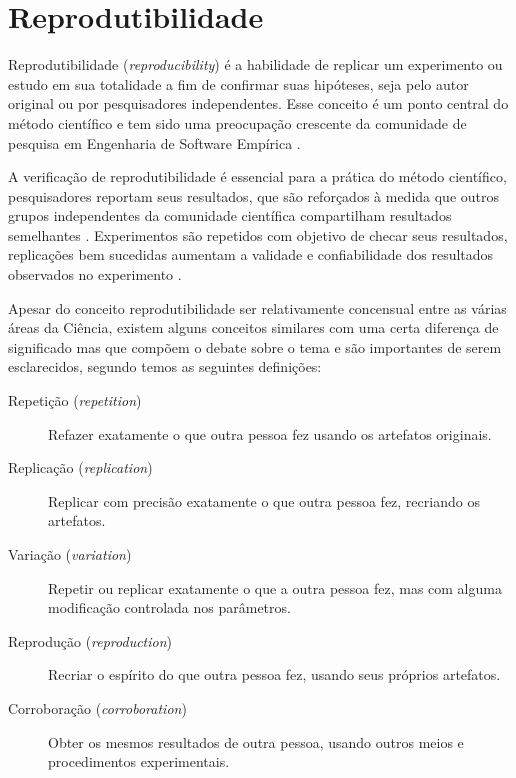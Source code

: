 \section{Reprodutibilidade}

Reprodutibilidade ({\it reproducibility}) é a habilidade de replicar um
experimento ou estudo em sua totalidade a fim de confirmar suas hipóteses, seja
pelo autor original ou por pesquisadores independentes. Esse conceito é um
ponto central do método científico e tem sido uma preocupação crescente da
comunidade de pesquisa em Engenharia de Software Empírica
\cite{gonzalez_reproducibility_2012}.

A verificação de reprodutibilidade é essencial para a prática do método
científico, pesquisadores reportam seus resultados, que são reforçados à medida
que outros grupos independentes da comunidade científica compartilham
resultados semelhantes \cite{mccormick_itk_2014}. Experimentos são repetidos
com objetivo de checar seus resultados, replicações bem sucedidas aumentam a
validade e confiabilidade dos resultados observados no experimento
\cite{almqvist_replication_2006,juristo_replication_2012}.

Apesar do conceito reprodutibilidade ser relativamente concensual entre as
várias áreas da Ciência, existem alguns conceitos similares com uma certa
diferença de significado mas que compõem o debate sobre o tema e são
importantes de serem esclarecidos, segundo
 temos as seguintes definições:


\begin{description}

  \item[Repetição ({\it repetition})]
  Refazer exatamente o que outra pessoa fez usando os artefatos originais.

  \item[Replicação ({\it replication})]
  Replicar com precisão exatamente o que outra pessoa fez, recriando os
  artefatos.

  \item[Variação ({\it variation})]
  Repetir ou replicar exatamente o que a outra pessoa fez, mas com alguma
  modificação controlada nos parâmetros.

  \item[Reprodução ({\it reproduction})]
  Recriar o espírito do que outra pessoa fez, usando seus próprios artefatos.

  \item[Corroboração ({\it corroboration})]
  Obter os mesmos resultados de outra pessoa, usando outros meios e
  procedimentos experimentais.

\end{description}

